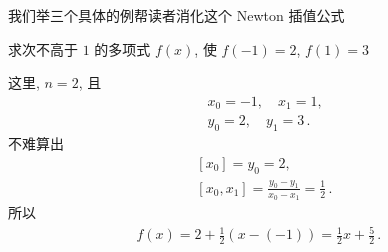 我们举三个具体的例帮读者消化这个 Newton 插值公式\period

\begin{example}
    求次不高于 $1$ 的多项式 $f(x)$, 使 $f(-1)=2$, $f(1)=3$\period

    这里, $n = 2$, 且
    \begin{align*}
         & x_0 = -1, \quad x_1 = 1,       \\
         & y_0 = 2, \quad y_1 = 3 \period
    \end{align*}
    不难算出
    \begin{align*}
         & [x_0] = y_0 = 2,                                           \\
         & [x_0, x_1] = \frac{y_0 - y_1}{x_0 - x_1} = \frac12 \period
    \end{align*}
    所以
    \begin{align*}
        f(x) = 2 + \frac12 (x - (-1)) = \frac12 x + \frac52 \period
    \end{align*}
\end{example}

